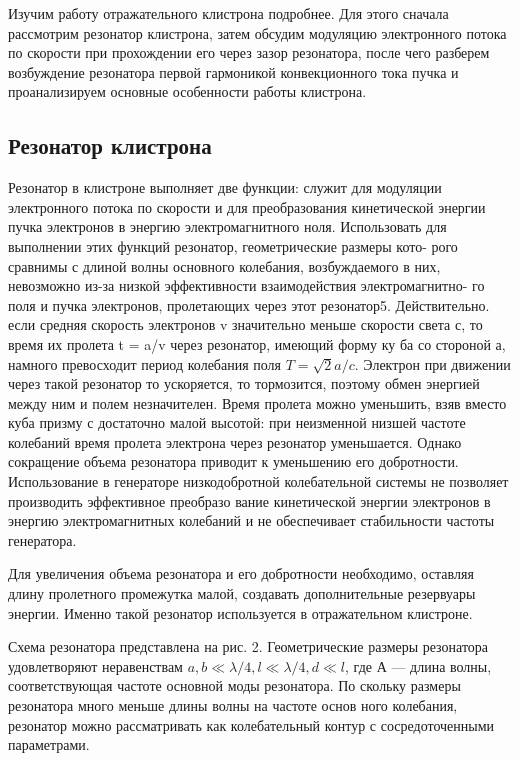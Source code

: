 Изучим работу отражательного клистрона подробнее. Для этого сначала
рассмотрим резонатор клистрона, затем обсудим модуляцию электронного
потока по скорости при прохождении его через зазор резонатора, после чего
разберем возбуждение резонатора первой гармоникой конвекционного тока
пучка и проанализируем основные особенности работы клистрона.


\subsection{Резонатор клистрона}

Резонатор в клистроне выполняет две функции: служит для модуляции
электронного потока по скорости и для преобразования кинетической энер­гии пучка электронов в энергию электромагнитного ноля. Использовать
для выполнении этих функций резонатор, геометрические размеры кото-
рого сравнимы с длиной волны основного колебания, возбуждаемого в них,
невозможно из-за низкой эффективности взаимодействия электромагнитно-
го поля и пучка электронов, пролетающих через этот резонатор5. Действи­тельно. если средняя скорость электронов v значительно меньше скорости
света с, то время их пролета t = a/v через резонатор, имеющий форму ку­
ба со стороной а, намного превосходит период колебания поля $T = \sqrt { 2 } a / c$.
Электрон при движении через такой резонатор то ускоряется, то тормозится,
поэтому обмен энергией между ним и полем незначителен. Время пролета
можно уменьшить, взяв вместо куба призму с достаточно малой высотой:
при неизменной низшей частоте колебаний время пролета электрона через
резонатор уменьшается. Однако сокращение объема резонатора приводит к
уменьшению его добротности. Использование в генераторе низкодобротной
колебательной системы не позволяет производить эффективное преобразо­
вание кинетической энергии электронов в энергию электромагнитных коле­баний и не обеспечивает стабильности частоты генератора.

Для увеличения объема резонатора и его добротности необходимо, остав­ляя длину пролетного промежутка малой, создавать дополнительные резервуары энергии. Именно такой резонатор используется в отражательном
клистроне.

Схема резонатора представлена на рис. 2. Геометрические размеры ре­зонатора удовлетворяют неравенствам 
$a , b \ll \lambda / 4 , l \ll \lambda / 4 , d \ll l$, где
А — длина волны, соответствующая частоте основной моды резонатора. По­
скольку размеры резонатора много меньше длины волны на частоте основ­
ного колебания, резонатор можно рассматривать как колебательный контур
с сосредоточенными параметрами.

